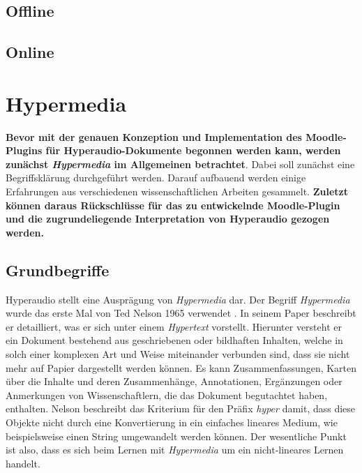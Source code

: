 \subsection{Offline}
\citep{reinmann1995kooperation}
\citep{reinmann2002analyse}
\citep{pauli2000rolle}

\subsection{Online}

\citep{dillenbourg1999collaborative}


\section{Hypermedia}
\textbf{Bevor mit der genauen Konzeption und Implementation des Moodle-Plugins für Hyperaudio-Dokumente begonnen werden kann, werden zunächst \textit{Hypermedia} im Allgemeinen betrachtet}. Dabei soll zunächst eine Begriffsklärung durchgeführt werden. Darauf aufbauend werden einige Erfahrungen aus verschiedenen wissenschaftlichen Arbeiten gesammelt. \textbf{Zuletzt können daraus Rückschlüsse für das zu entwickelnde Moodle-Plugin und die zugrundeliegende Interpretation von Hyperaudio gezogen werden.}

\subsection{Grundbegriffe}
Hyperaudio stellt eine Ausprägung von \textit{Hypermedia} dar. Der Begriff \textit{Hypermedia} wurde das erste Mal von Ted Nelson 1965 verwendet \citep{nelson1965complex}. In seinem Paper beschreibt er detailliert, was er sich unter einem \textit{Hypertext} vorstellt. Hierunter versteht er ein Dokument bestehend aus geschriebenen oder bildhaften Inhalten, welche in solch einer komplexen Art und Weise miteinander verbunden sind, dass sie nicht mehr auf Papier dargestellt werden können. Es kann Zusammenfassungen, Karten über die Inhalte und deren Zusammenhänge, Annotationen, Ergänzungen oder Anmerkungen von Wissenschaftlern, die das Dokument begutachtet haben, enthalten. Nelson beschreibt das Kriterium für den Präfix \textit{hyper} damit, dass diese Objekte nicht durch eine Konvertierung in ein einfaches lineares Medium, wie beispielsweise einen String umgewandelt werden können. Der wesentliche Punkt ist also, dass es sich beim Lernen mit \textit{Hypermedia} um ein nicht-lineares Lernen handelt.

